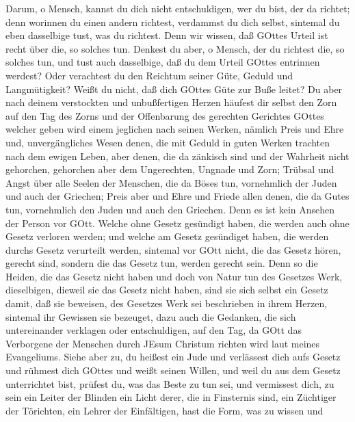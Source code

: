  Darum, o Mensch, kannst du dich nicht entschuldigen, wer du
bist, der da richtet; denn worinnen du einen andern richtest, verdammst
du dich selbst, sintemal du eben dasselbige tust, was du richtest.
 Denn wir wissen, daß GOttes Urteil ist recht über die, so
solches tun.  Denkest du aber, o Mensch, der du richtest
die, so solches tun, und tust auch dasselbige, daß du dem Urteil GOttes
entrinnen werdest?  Oder verachtest du den Reichtum seiner
Güte, Geduld und Langmütigkeit? Weißt du nicht, daß dich GOttes Güte zur
Buße leitet?  Du aber nach deinem verstockten und
unbußfertigen Herzen häufest dir selbst den Zorn auf den Tag des Zorns
und der Offenbarung des gerechten Gerichtes GOttes  welcher
geben wird einem jeglichen nach seinen Werken,  nämlich
Preis und Ehre und, unvergängliches Wesen denen, die mit Geduld in guten
Werken trachten nach dem ewigen Leben,  aber denen, die da
zänkisch sind und der Wahrheit nicht gehorchen, gehorchen aber dem
Ungerechten, Ungnade und Zorn;  Trübsal und Angst über alle
Seelen der Menschen, die da Böses tun, vornehmlich der Juden und auch
der Griechen;  Preis aber und Ehre und Friede allen denen,
die da Gutes tun, vornehmlich den Juden und auch den Griechen.
 Denn es ist kein Ansehen der Person vor GOtt.
 Welche ohne Gesetz gesündigt haben, die werden auch ohne
Gesetz verloren werden; und welche am Gesetz gesündiget haben, die
werden durchs Gesetz verurteilt werden,  sintemal vor GOtt
nicht, die das Gesetz hören, gerecht sind, sondern die das Gesetz tun,
werden gerecht sein.  Denn so die Heiden, die das Gesetz
nicht haben und doch von Natur tun des Gesetzes Werk, dieselbigen,
dieweil sie das Gesetz nicht haben, sind sie sich selbst ein Gesetz
 damit, daß sie beweisen, des Gesetzes Werk sei beschrieben
in ihrem Herzen, sintemal ihr Gewissen sie bezeuget, dazu auch die
Gedanken, die sich untereinander verklagen oder entschuldigen,
 auf den Tag, da GOtt das Verborgene der Menschen durch
JEsum Christum richten wird laut meines Evangeliums.  Siehe
aber zu, du heißest ein Jude und verlässest dich aufs Gesetz und rühmest
dich GOttes  und weißt seinen Willen, und weil du aus dem
Gesetz unterrichtet bist, prüfest du, was das Beste zu tun sei,
 und vermissest dich, zu sein ein Leiter der Blinden ein
Licht derer, die in Finsternis sind,  ein Züchtiger der
Törichten, ein Lehrer der Einfältigen, hast die Form, was zu wissen und
